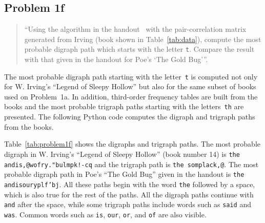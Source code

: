 \documentclass[conference]{IEEEtran}
\newcommand{\codeinline}[1]{{\fontsize{8}{0}\selectfont\texttt{#1}}}
\newcommand{\codefile}[1]{
  \begin{framed}
  \fontsize{5.65}{6.78}\selectfont
  
  \end{framed}
}
\begin{document}
\subsection{Problem 1f}

\begin{quote}
``Using the algorithm in the handout~\cite{Bennett1976} with the pair-correlation matrix generated from Irving (book shown in Table~\ref{tab:data}), compute the most probable digraph path which starts with the letter \codeinline{t}.
Compare the result with that given in the handout for Poe's `The Gold Bug'''.
\end{quote}
\vspace{0.75em}

The most probable digraph path starting with the letter~\codeinline{t} is computed not only for W. Irving's ``Legend of Sleepy Hollow'' but also for the same subset of books used on Problem~1a.
In addition, third-order frequency tables are built from the books and the most probable trigraph paths starting with the letters~\codeinline{th} are presented. 
The following Python code computes the digraph and trigraph paths from the books.

\codefile{problem1f.py}

Table~\ref{tab:problem1f} shows the digraphs and trigraph paths.
The most probable digraph in W. Irving's ``Legend of Sleepy Hollow'' (book number 14) is \codeinline{the andis,@wofry."bulmpk!-cq} and the trigraph path is \codeinline{the somplack,@}.
The most probable digraph path in Poe's ``The Gold Bug'' given in the handout is \codeinline{the andisouryplf'bj}.
All these paths begin with the word \codeinline{the} followed by a space, which is also true for the rest of the paths.
All the digraph paths continue with \codeinline{and} after the space, while some trigraph paths include words such as \codeinline{said} and \codeinline{was}.
Common words such as \codeinline{is}, \codeinline{our}, \codeinline{or}, and \codeinline{of} are also visible.
\end{document}
